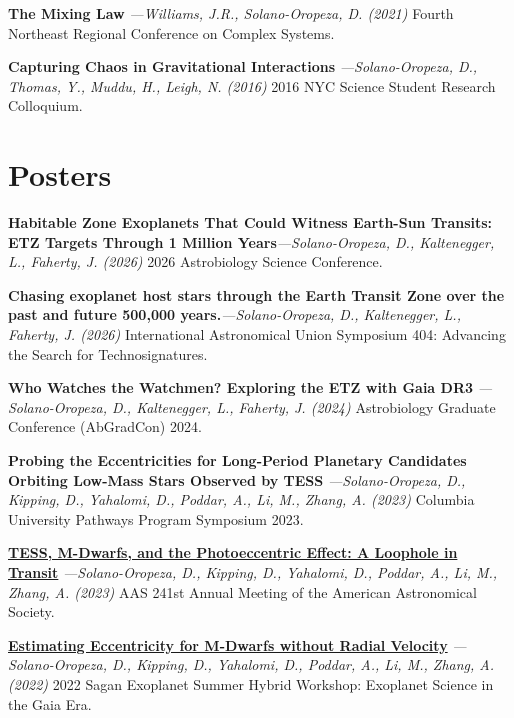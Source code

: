 \documentclass[a4paper,11pt]{article}
\begin{document}
    \textbf{The Mixing Law} \textit{—Williams, J.R., Solano-Oropeza, D. (2021)} Fourth Northeast Regional Conference on Complex Systems.
    \vspace{1.5mm}
    
    \textbf{Capturing Chaos in Gravitational Interactions} \textit{—Solano-Oropeza, D., Thomas, Y., Muddu, H., Leigh, N. (2016)} 2016 NYC Science Student Research Colloquium.

\section{Posters}

    \textbf{Habitable Zone Exoplanets That Could Witness Earth-Sun Transits: ETZ Targets Through 1 Million Years}\textit{—Solano-Oropeza, D., Kaltenegger, L., Faherty, J. (2026)} 2026 Astrobiology Science Conference.
    \vspace{1.5mm}

    \textbf{Chasing exoplanet host stars through the Earth Transit Zone over the past and future 500,000 years.}\textit{—Solano-Oropeza, D., Kaltenegger, L., Faherty, J. (2026)} International Astronomical Union Symposium 404: Advancing the Search for Technosignatures.
    \vspace{1.5mm}
    
    \textbf{Who Watches the Watchmen? Exploring the ETZ with Gaia DR3} \textit{—Solano-Oropeza, D., Kaltenegger, L., Faherty, J. (2024)} Astrobiology Graduate Conference (AbGradCon) 2024.
    \vspace{1.5mm}

    \textbf{Probing the Eccentricities  for Long-Period Planetary Candidates Orbiting Low-Mass Stars Observed by TESS} \textit{—Solano-Oropeza, D., Kipping, D., Yahalomi, D., Poddar, A., Li, M., Zhang, A. (2023)} Columbia University Pathways Program Symposium 2023.
    \vspace{1.5mm}
    
    {\href{https://aas241-aas.ipostersessions.com/default.aspx?s=69-03-D2-AA-C9-A5-80-09-09-82-5E-BB-68-E9-8B-24&guestview=true}{\textbf{TESS, M-Dwarfs, and the Photoeccentric Effect: A Loophole in Transit}}} \textit{—Solano-Oropeza, D., Kipping, D., Yahalomi, D., Poddar, A., Li, M., Zhang, A. (2023)}  AAS 241st Annual Meeting of the American Astronomical Society.
    \vspace{1.5mm}
    
    {\href{https://nexsci.caltech.edu/workshop/2022/posters/finalmaybe_sagan22_eccentricity_poster.pdf}{\textbf{Estimating Eccentricity for M-Dwarfs without Radial Velocity}}} \textit{—Solano-Oropeza, D., Kipping, D., Yahalomi, D., Poddar, A., Li, M., Zhang, A. (2022)} 2022 Sagan Exoplanet Summer Hybrid Workshop: Exoplanet Science in the Gaia Era.
    \vspace{1.5mm}
    
\end{document}
